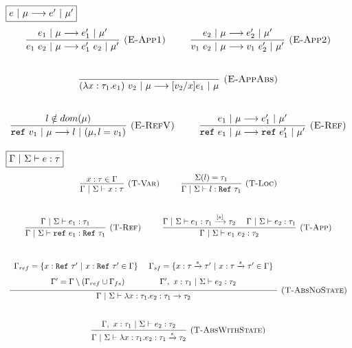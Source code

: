 \documentclass{llncs}
\newcommand{\reftt}{\mathtt{ref}~}
\newcommand{\Reftt}{\mathtt{Ref}~}
\begin{document}
$\fbox{$e~|~\mu \longrightarrow e'~|~\mu'$}$
\[
\begin{array}{c}
\infer[\textsc{(E-App1)}]
  {e_1~e_2~|~\mu \longrightarrow e_1'~e_2~|~\mu'}
  {e_1~|~\mu \longrightarrow e_1'~|~\mu'} 
~~~~~~~~
\infer[\textsc{(E-App2)}]
  {v_1~e_2~|~\mu \longrightarrow v_1~e_2'~|~\mu'}
  {e_2~|~\mu \longrightarrow e_2'~|~\mu'}\\[5ex]

\infer[\textsc{(E-AppAbs)}]
  {(\lambda x : \tau_1.e_1)~v_2~|~\mu \longrightarrow [v_2/x]e_1~|~\mu}
  { }\\[5ex]

\infer[\textsc{(E-RefV)}]
  {\reftt v_1~|~\mu \longrightarrow l ~|~(\mu, l = v_1)}
  {l \notin dom(\mu)}
~~~~~~~~
\infer[\textsc{(E-Ref)}]
  {\reftt e_1~|~\mu \longrightarrow \reftt e_1'~|~\mu'}
  {e_1~|~\mu \longrightarrow e_1'~|~\mu'}
\end{array}
\]

$\fbox{$\Gamma~|~\Sigma \vdash e : \tau$}$
\[
\begin{array}{c}
\infer[\textsc{(T-Var)}]
  {\Gamma~|~\Sigma \vdash x : \tau}
  {x : \tau \in \Gamma}
~~~~~~~~  
\infer[\textsc{(T-Loc)}]
  {\Gamma~|~\Sigma \vdash l : \Reftt \tau_1}
  {\Sigma(l) = \tau_1}\\[5ex]

\infer[\textsc{(T-Ref)}]
  {\Gamma~|~\Sigma \vdash \reftt e_1 : \Reftt \tau_1}
  {\Gamma~|~\Sigma \vdash e_1 : \tau_1}
~~~~~~~~
\infer[\textsc{(T-App)}]
  {\Gamma~|~\Sigma \vdash e_1~e_2 : \tau_2}
  {\Gamma~|~\Sigma \vdash e_1 : \tau_1 \xrightarrow{[s]} \tau_2
  ~~~~ \Gamma~|~\Sigma \vdash e_2 : \tau_1}\\[5ex]

\infer[\textsc{(T-AbsNoState)}]
  {\Gamma~|~\Sigma \vdash \lambda x : \tau_1.e_2 : \tau_1 \rightarrow \tau_2}
  {\def\arraystretch{1.6}
  \begin{array}{c}
\Gamma_{ref} = \{x : \Reftt \tau'~|~ x : \Reftt \tau' \in \Gamma\}~~~~
\Gamma_{sf} = \{ x : \tau \xrightarrow{s} \tau'~|~x : \tau \xrightarrow{s} \tau' \in \Gamma \} \\
\Gamma' = \Gamma \setminus (\Gamma_{ref} \cup \Gamma_{fs})~~~~~~~~~~~~~\Gamma',~x : \tau_1~|~\Sigma \vdash e_2 : \tau_2
  \end{array}}\\[5ex]

\infer[\textsc{(T-AbsWithState)}]
  {\Gamma~|~\Sigma \vdash \lambda x : \tau_1.e_2 : \tau_1 \xrightarrow{s} \tau_2}
  {\Gamma,~x : \tau_1~|~\Sigma \vdash e_2 : \tau_2}\\[5ex]

\end{array}
\]
\end{document}
